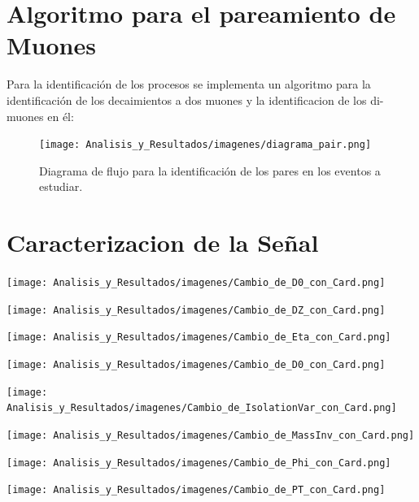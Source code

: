 \section{Algoritmo para el pareamiento de Muones}
Para la identificación de los procesos se implementa un algoritmo para la identificación de los decaimientos a dos muones y la identificacion de los di-muones en él:
\begin{figure}[ht!]
    \centering
    \texttt{[image: Analisis\_y\_Resultados/imagenes/diagrama\_pair.png]}
    \caption{Diagrama de flujo para la identificación de los pares en los eventos a estudiar.}
    \label{fig:diagrama_pair}
\end{figure}


\section{Caracterizacion de la Señal}

    \texttt{[image: Analisis\_y\_Resultados/imagenes/Cambio\_de\_D0\_con\_Card.png]}
    
    \texttt{[image: Analisis\_y\_Resultados/imagenes/Cambio\_de\_DZ\_con\_Card.png]}
    
    \texttt{[image: Analisis\_y\_Resultados/imagenes/Cambio\_de\_Eta\_con\_Card.png]}
    
    \texttt{[image: Analisis\_y\_Resultados/imagenes/Cambio\_de\_D0\_con\_Card.png]}
    
    \texttt{[image: Analisis\_y\_Resultados/imagenes/Cambio\_de\_IsolationVar\_con\_Card.png]}
    
    \texttt{[image: Analisis\_y\_Resultados/imagenes/Cambio\_de\_MassInv\_con\_Card.png]}
    
    
    \texttt{[image: Analisis\_y\_Resultados/imagenes/Cambio\_de\_Phi\_con\_Card.png]}
    
    
    \texttt{[image: Analisis\_y\_Resultados/imagenes/Cambio\_de\_PT\_con\_Card.png]}
    
    









